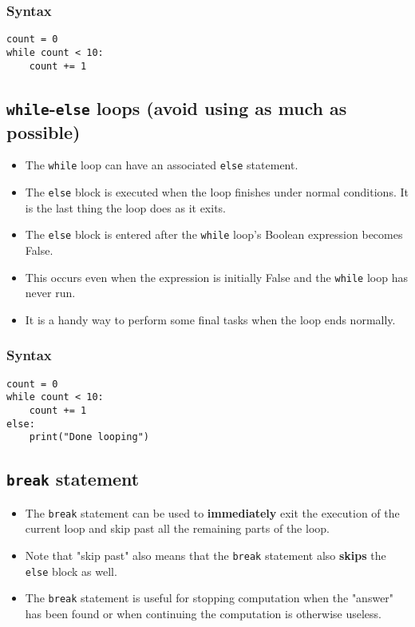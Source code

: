 \documentclass[11pt]{article}
\begin{document}
\subsubsection{Syntax}
\label{sec:org53fa8b2}
\begin{verbatim}
count = 0
while count < 10:
    count += 1
\end{verbatim}

\subsection{\texttt{while}-\texttt{else} loops (avoid using as much as possible)}
\label{sec:org2238774}
\begin{itemize}
\item The \texttt{while} loop can have an associated \texttt{else} statement.
\item The \texttt{else} block is executed when the loop finishes under normal conditions. It is the last thing the loop does as it exits.
\item The \texttt{else} block is entered after the \texttt{while} loop's Boolean expression becomes False.
\item This occurs even when the expression is initially False and the \texttt{while} loop has never run.
\item It is a handy way to perform some final tasks when the loop ends normally.
\end{itemize}

\subsubsection{Syntax}
\label{sec:org56f888b}
\begin{verbatim}
count = 0
while count < 10:
    count += 1
else:
    print("Done looping")
\end{verbatim}

\subsection{\texttt{break} statement}
\label{sec:org4ed2ee9}
\begin{itemize}
\item The \texttt{break} statement can be used to \textbf{immediately} exit the execution of the current loop and skip past all the remaining parts of the loop.
\item Note that "skip past" also means that the \texttt{break} statement also \textbf{skips} the \texttt{else} block as well.
\item The \texttt{break} statement is useful for stopping computation when the "answer" has been found or when continuing the computation is otherwise useless.
\end{itemize}
\end{document}
